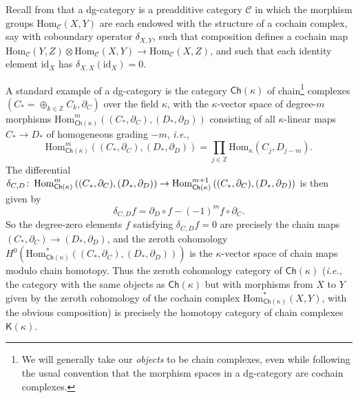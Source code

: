 \documentclass[11pt]{amsart}
\theoremstyle{definition}
\theoremstyle{remark}
\numberwithin{equation}{section}
\def\co{\colon\thinspace}
\def\Z{\mathbb{Z}}
\begin{document}
Recall from \cite{BK} that a dg-category is a preadditive category $\mathcal{C}$ in which the morphism groups $\mathrm{Hom}_{\mathcal{C}}(X,Y)$ are each endowed with the structure of a cochain complex, say with coboundary operator $\delta_{X,Y}$, such that composition defines a cochain map $\mathrm{Hom}_{\mathcal{C}}(Y,Z)\otimes \mathrm{Hom}_{\mathcal{C}}(X,Y)\to \mathrm{Hom}_{\mathcal{C}}(X,Z)$, and such that each identity element $\mathrm{id}_X$ has $\delta_{X,X}(\mathrm{id}_X)=0$. %

A standard example of a dg-category is the category $\mathsf{Ch}(\kappa)$ of chain\footnote{We will generally take our \emph{objects} to be chain complexes, even while following the usual convention that the morphism spaces in a dg-category are cochain complexes.} complexes $\left(C_*=\oplus_{k\in \Z}C_k,\partial_C \right)$ over  the field $\kappa$, with the $\kappa$-vector space of degree-$m$ morphisms $\mathrm{Hom}_{\mathsf{Ch}(\kappa)}^{m}\left((C_*,\partial_C),(D_*,\partial_D)\right)$ consisting of all $\kappa$-linear maps $C_*\to D_*$ of homogeneous grading $-m$, \emph{i.e.}, \[ \mathrm{Hom}_{\mathsf{Ch}(\kappa)}^{m}\left((C_*,\partial_C),(D_*,\partial_D)\right)=\prod_{j\in \Z}\mathrm{Hom}_{\kappa}(C_j,D_{j-m}).\]  The differential $\delta_{C,D}\co \mathrm{Hom}_{\mathsf{Ch}(\kappa)}^{m}\left((C_*,\partial_C),(D_*,\partial_D)\right)\to \mathrm{Hom}_{\mathsf{Ch}(\kappa)}^{m+1}\left((C_*,\partial_C),(D_*,\partial_D)\right)$ is then given by \[ \delta_{C,D} f=\partial_D\circ f-(-1)^mf\circ\partial_C. \]
So the degree-zero elements $f$ satisfying $\delta_{C,D} f=0$ are precisely the chain maps $(C_*,\partial_C)\to (D_*,\partial_D)$, and the zeroth cohomology $H^0(\mathrm{Hom}_{\mathsf{Ch}(\kappa)}^{*}\left((C_*,\partial_C),(D_*,\partial_D)\right))$ is the $\kappa$-vector space of chain maps modulo chain homotopy.  Thus the zeroth cohomology category of $\mathsf{Ch}(\kappa)$ (\emph{i.e.}, the category with the same objects as $\mathsf{Ch}(\kappa)$ but with morphisms from $X$ to $Y$ given by the zeroth cohomology of the cochain complex $\mathrm{Hom}^*_{\mathsf{Ch}(\kappa)}(X,Y)$, with the obvious composition) is precisely the homotopy category of chain complexes $\mathsf{K}(\kappa)$.
\end{document}
